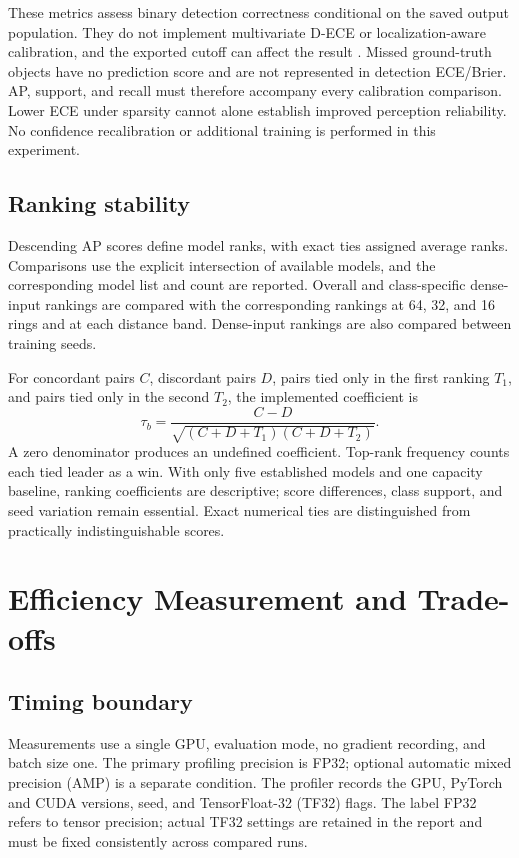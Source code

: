 \documentclass[10pt,twocolumn]{article}
\begin{document}
These metrics assess binary detection correctness conditional on the saved output population. They do not implement multivariate D-ECE or localization-aware calibration, and the exported cutoff can affect the result \cite{kuppers2020calibration,kuzucu2024calibration}. Missed ground-truth objects have no prediction score and are not represented in detection ECE/Brier. AP, support, and recall must therefore accompany every calibration comparison. Lower ECE under sparsity cannot alone establish improved perception reliability. No confidence recalibration or additional training is performed in this experiment.

\subsection{Ranking stability}
\label{sec:ranking}
Descending AP scores define model ranks, with exact ties assigned average ranks. Comparisons use the explicit intersection of available models, and the corresponding model list and count are reported. Overall and class-specific dense-input rankings are compared with the corresponding rankings at 64, 32, and 16 rings and at each distance band. Dense-input rankings are also compared between training seeds.

For concordant pairs $C$, discordant pairs $D$, pairs tied only in the first ranking $T_1$, and pairs tied only in the second $T_2$, the implemented coefficient is
\begin{equation}
\tau_b=\frac{C-D}{\sqrt{(C+D+T_1)(C+D+T_2)}}.
\end{equation}
A zero denominator produces an undefined coefficient. Top-rank frequency counts each tied leader as a win. With only five established models and one capacity baseline, ranking coefficients are descriptive; score differences, class support, and seed variation remain essential. Exact numerical ties are distinguished from practically indistinguishable scores.

\section{Efficiency Measurement and Trade-offs}
\label{sec:efficiency}
\subsection{Timing boundary}
Measurements use a single GPU, evaluation mode, no gradient recording, and batch size one. The primary profiling precision is FP32; optional automatic mixed precision (AMP) is a separate condition. The profiler records the GPU, PyTorch and CUDA versions, seed, and TensorFloat-32 (TF32) flags. The label FP32 refers to tensor precision; actual TF32 settings are retained in the report and must be fixed consistently across compared runs.
\end{document}
